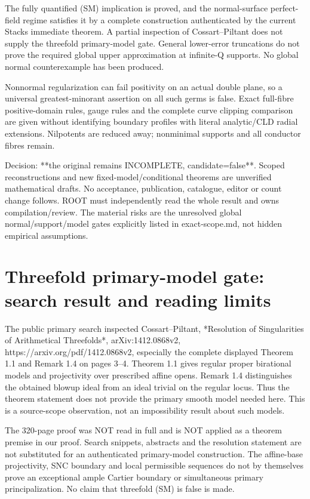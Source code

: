 \documentclass[11pt]{article}
\begin{document}
The fully quantified (SM) implication is proved, and the normal-surface perfect-field regime satisfies it by a complete construction authenticated by the current Stacks immediate theorem. A partial inspection of Cossart--Piltant does not supply the threefold primary-model gate. General lower-error truncations do not prove the required global upper approximation at infinite-Q supports. No global normal counterexample has been produced.

Nonnormal regularization can fail positivity on an actual double plane, so a universal greatest-minorant assertion on all such germs is false. Exact full-fibre positive-domain rules, gauge rules and the complete curve clipping comparison are given without identifying boundary profiles with literal analytic/CLD radial extensions. Nilpotents are reduced away; nonminimal supports and all conductor fibres remain.

Decision: **the original remains INCOMPLETE, candidate=false**. Scoped reconstructions and new fixed-model/conditional theorems are unverified mathematical drafts. No acceptance, publication, catalogue, editor or count change follows. ROOT must independently read the whole result and owns compilation/review. The material risks are the unresolved global normal/support/model gates explicitly listed in exact-scope.md, not hidden empirical assumptions. 

\section{Threefold primary-model gate: search result and reading limits}

The public primary search inspected Cossart--Piltant, *Resolution of Singularities of Arithmetical Threefolds*, arXiv:1412.0868v2, https://arxiv.org/pdf/1412.0868v2, especially the complete displayed Theorem 1.1 and Remark 1.4 on pages 3--4. Theorem 1.1 gives regular proper birational models and projectivity over prescribed affine opens. Remark 1.4 distinguishes the obtained blowup ideal from an ideal trivial on the regular locus. Thus the theorem statement does not provide the primary smooth model needed here. This is a source-scope observation, not an impossibility result about such models.

The 320-page proof was NOT read in full and is NOT applied as a theorem premise in our proof. Search snippets, abstracts and the resolution statement are not substituted for an authenticated primary-model construction. The affine-base projectivity, SNC boundary and local permissible sequences do not by themselves prove an exceptional ample Cartier boundary or simultaneous primary principalization. No claim that threefold (SM) is false is made.
\end{document}
